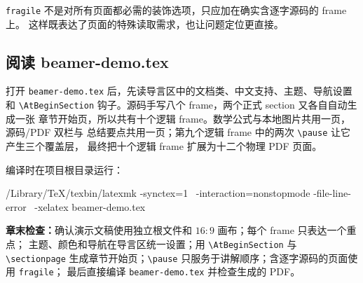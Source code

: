 \texttt{fragile} 不是对所有页面都必需的装饰选项，只应加在确实含逐字源码的 frame 上。
这样既表达了页面的特殊读取需求，也让问题定位更直接。

\subsection{阅读 beamer-demo.tex}

打开 \texttt{beamer-demo.tex} 后，先读导言区中的文档类、中文支持、主题、导航设置和
\verb|\AtBeginSection| 钩子。源码手写八个 frame，两个正式 section 又各自自动生成一张
章节开始页，所以共有十个逻辑 frame。数学公式与本地图片共用一页，源码/PDF 双栏与
总结要点共用一页；第九个逻辑 frame 中的两次 \verb|\pause| 让它产生三个覆盖层，
最终把十个逻辑 frame 扩展为十二个物理 PDF 页面。

编译时在项目根目录运行：

\begin{codeblock}
/Library/TeX/texbin/latexmk -synctex=1 \
  -interaction=nonstopmode -file-line-error \
  -xelatex beamer-demo.tex
\end{codeblock}

\begin{resultbox}
\textbf{章末检查：}确认演示文稿使用独立根文件和 $16:9$ 画布；每个 frame 只表达一个重点；
主题、颜色和导航在导言区统一设置；用 \verb|\AtBeginSection| 与 \verb|\sectionpage|
生成章节开始页；\verb|\pause| 只服务于讲解顺序；含逐字源码的页面使用 \texttt{fragile}；
最后直接编译 \texttt{beamer-demo.tex} 并检查生成的 PDF。
\end{resultbox}
